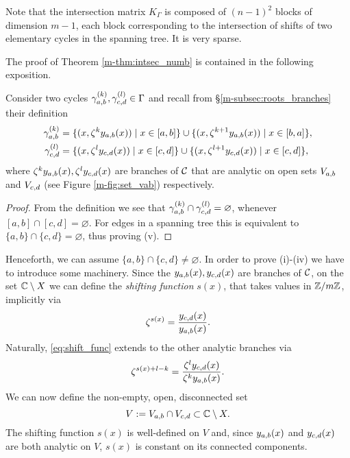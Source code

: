 \documentclass[main.tex]{subfiles}
\begin{document}
 \begin{rmk}
     Note that the intersection matrix $K_{\Gamma}$ is composed of
  $(n-1)^2$ blocks of dimension $m-1$, each block corresponding to the intersection
  of shifts of two elementary cycles in the spanning tree. It is very sparse.
 \end{rmk}


 \bigskip
 The proof of Theorem \ref{m-thm:intsec_numb} is contained in the following exposition.
 \bigskip

  Consider
  two cycles $\gamma_{a,b}^{(k)},\gamma_{c,d}^{(l)} \in \Gamma$ and
  recall from \S \ref{m-subsec:roots_branches} their definition
   \begin{align*}
      \gamma_{a,b}^{(k)} & = \{  (x,\zeta^k y_{a,b}(x))  \mid  x \in [a,b]  \} \cup \{  (x,\zeta^{k+1} y_{a,b}(x))  \mid  x \in [b,a]  \}, \\
      \gamma_{c,d}^{(l)} & = \{  (x,\zeta^l y_{c,d}(x))  \mid  x \in [c,d]  \} \cup \{  (x,\zeta^{l+1} y_{c,d}(x))  \mid  x \in [c,d]  \},
   \end{align*}
  where $\zeta^ky_{a,b}(x),\zeta^ly_{c,d}(x)$ are branches of $\mathcal{C}$ that are analytic on open sets $V_{a,b}$ and $V_{c,d}$
  (see Figure \ref{m-fig:set_vab}) respectively.

  \begin{proof}
  From the definition we see that $\gamma_{a,b}^{(k)} \cap \gamma_{c,d}^{(l)} = \varnothing$, whenever $[a,b] \cap [c,d] = \varnothing$. For edges in a spanning tree
  this is equivalent to $\{a,b\} \cap \{c,d\} = \varnothing$, thus
  proving (v).
  \end{proof}

   Henceforth, we can assume $\{a,b\} \cap \{c,d\} \ne \varnothing$. In order to prove (i)-(iv) we have to introduce some machinery. Since the $y_{a,b}(x),y_{c,d}(x)$ are branches of $\mathcal{C}$,
   on the set $\mathbb{C} \setminus X$
   we can define the \emph{shifting function}
   $s(x)$, that takes values in $\mathbb{Z}/m\mathbb{Z}$, implicitly via
  \begin{equation}\label{eq:shift_func}
   \zeta^{s(x)} = \frac{y_{c,d}(x)}{y_{a,b}(x)}.
   \end{equation}
  Naturally, \eqref{eq:shift_func} extends to the other analytic branches via
  \begin{equation*}
   \zeta^{s(x)+l-k} = \frac{\zeta^ly_{c,d}(x)}{\zeta^ky_{a,b}(x)}.
   \end{equation*}
   We can now define the non-empty, open, disconnected set
   \begin{equation*}
    V := V_{a,b} \cap V_{c,d} \subset \mathbb{C} \setminus X.
   \end{equation*}
 The shifting function $s(x)$ is well-defined on $V$ and, since $y_{a,b}(x)$ and $y_{c,d}(x)$ are
  both analytic on $V$, $s(x)$ is constant on its
  connected components.
\end{document}
